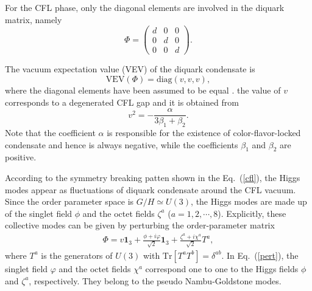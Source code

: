 \documentclass[prd, showpacs,nofootinbib,amsmath,amssymb]{revtex4}
\begin{document}
For the CFL phase, only the diagonal elements are involved in the diquark matrix, namely
\begin{equation}
  \label{eq:phi}
  \Phi =
  \begin{pmatrix}
    d & 0 & 0 \\
    0 & d & 0 \\
    0 & 0 & d
    \end{pmatrix}.
\end{equation}
 
 

The vacuum expectation value (VEV) of the diquark condensate is
\begin{equation}
  \text{VEV}(\Phi)=\text{diag}(v,v,v) ,\label{cflground}
\end{equation}
where the diagonal elements have been assumed to be equal \cite{iida2002superfluid}. 
the value of
$v$ corresponds to a degenerated CFL gap and it is obtained from
\begin{equation}
  \label{eq:dvaccum}
v^2 = -\frac{\alpha}{3\beta_1+\beta_2}.
\end{equation}
Note that the coefficient $\alpha$ is responsible for the existence of color-flavor-locked condensate
and hence is always negative, while the coefficients $\beta_1$ and $\beta_2$ are positive.


According to the symmetry breaking patten shown in the Eq.~(\ref{cfl}),
the Higgs modes appear as fluctuations of diquark condensate around the
CFL vacuum. Since the order parameter space is $G/H \simeq U(3)$, the Higgs modes are made up of the
singlet field $\phi$ and the octet fields $\zeta^a$ ($a = 1, 2, \cdots, 8$). Explicitly, these
collective modes can be given by perturbing the order-parameter matrix
\begin{eqnarray}
\Phi=v\textbf{1}_3+\frac{\phi+i\varphi}{\sqrt{2}}\textbf{1}_3+\frac{\zeta^a+i\chi^a}{\sqrt{2}}T^a,
\label{pert}
\end{eqnarray}
where $T^a$ is the generators of $U(3)$ with $\text{Tr}[T^a T^b]=\delta^{ab}$.
In Eq.~(\ref{pert}), the singlet field $\varphi$ and the octet fields $\chi^a$ correspond one to
one to the Higgs fields $\phi$ and $\zeta^a$, respectively. They belong to the pseudo Nambu-Goldstone
modes.
\end{document}
